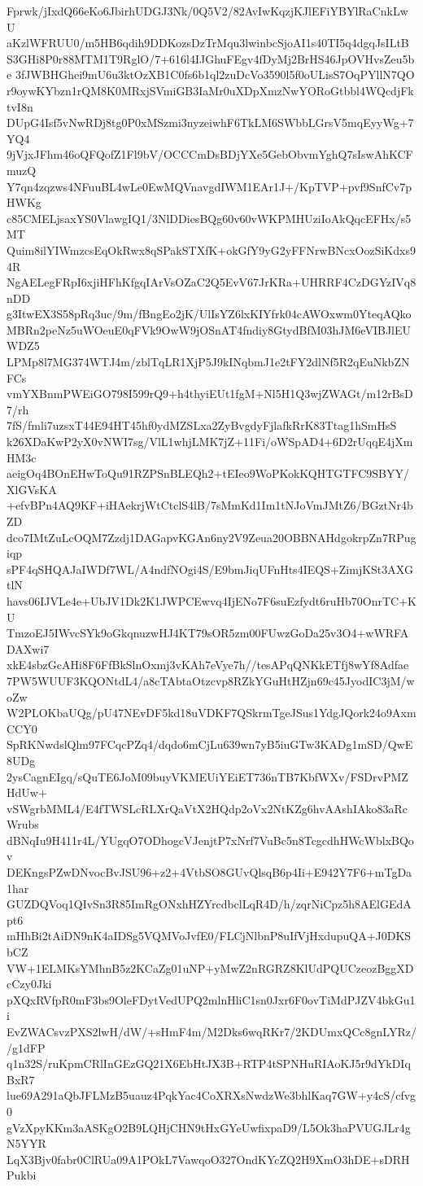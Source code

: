 Fprwk/jIxdQ66eKo6JbirhUDGJ3Nk/0Q5V2/82AvIwKqzjKJlEFiYBYlRaCnkLwU
aKzlWFRUU0/m5HB6qdih9DDKozsDzTrMqu3lwinbcSjoAI1s40TI5q4dgqJsILtB
S3GHi8P0r88MTM1T9RglO/7+616l4IJGhuFEgv4fDyMj2BrHS46JpOVHvsZeu5be
3fJWBHGhei9mU6u3ktOzXB1C0fs6b1ql2zuDcVo3590l5f0oULisS7OqPYllN7QO
r9oywKYbzn1rQM8K0MRxjSVmiGB3IaMr0uXDpXmzNwYORoGtbbl4WQcdjFktvI8n
DUpG4Isf5vNwRDj8tg0P0xMSzmi3nyzeiwhF6TkLM6SWbbLGrsV5mqEyyWg+7YQ4
9jVjxJFhm46oQFQofZ1Fl9bV/OCCCmDsBDjYXe5GebObvmYghQ7sIswAhKCFmuzQ
Y7qn4zqzws4NFuuBL4wLe0EwMQVnavgdIWM1EAr1J+/KpTVP+pvf9SnfCv7pHWKg
c85CMELjsaxYS0VlawgIQ1/3NlDDiesBQg60v60vWKPMHUziIoAkQqcEFHx/s5MT
Quim8ilYIWmzcsEqOkRwx8qSPakSTXfK+okGfY9yG2yFFNrwBNcxOozSiKdxs94R
NgAELegFRpI6xjiHFhKfgqIArVsOZaC2Q5EvV67JrKRa+UHRRF4CzDGYzIVq8nDD
g3ItwEX3S58pRq3uc/9m/fBngEo2jK/UlIsYZ6lxKIYfrk04cAWOxwm0YteqAQko
MBRn2peNz5uWOeuE0qFVk9OwW9jOSnAT4fndiy8GtydBfM03hJM6eVIBJlEUWDZ5
LPMp8l7MG374WTJ4m/zblTqLR1XjP5J9kINqbmJ1e2tFY2dlNf5R2qEuNkbZNFCs
vmYXBnmPWEiGO798I599rQ9+h4thyiEUt1fgM+Nl5H1Q3wjZWAGt/m12rBsD7/rh
7fS/fmli7uzsxT44E94HT45hf0ydMZSLxa2ZyBvgdyFjlafkRrK83Ttag1hSmHsS
k26XDaKwP2yX0vNWI7sg/VlL1whjLMK7jZ+11Fi/oWSpAD4+6D2rUqqE4jXmHM3c
aeigOq4BOnEHwToQu91RZPSnBLEQh2+tEIeo9WoPKokKQHTGTFC9SBYY/XlGVsKA
+efvBPn4AQ9KF+iHAekrjWtCtclS4lB/7sMmKd1Im1tNJoVmJMtZ6/BGztNr4bZD
dco7IMtZuLcOQM7Zzdj1DAGapvKGAn6ny2V9Zeua20OBBNAHdgokrpZn7RPugiqp
sPF4qSHQAJaIWDf7WL/A4ndfNOgi4S/E9bmJiqUFnHts4IEQS+ZimjKSt3AXGtlN
havs06IJVLe4e+UbJV1Dk2K1JWPCEwvq4IjENo7F6suEzfydt6ruHb70OnrTC+KU
TmzoEJ5IWvcSYk9oGkqnuzwHJ4KT79sOR5zm00FUwzGoDa25v3O4+wWRFADAXwi7
xkE4sbzGcAHi8F6FfBkSlnOxmj3vKAh7eVye7h//tesAPqQNKkETfj8wYf8Adfae
7PW5WUUF3KQONtdL4/a8cTAbtaOtzcvp8RZkYGuHtHZjn69c45JyodIC3jM/woZw
W2PLOKbaUQg/pU47NEvDF5kd18uVDKF7QSkrmTgeJSus1YdgJQork24o9AxmCCY0
SpRKNwdslQlm97FCqcPZq4/dqdo6mCjLu639wn7yB5iuGTw3KADg1mSD/QwE8UDg
2ysCagnEIgq/sQuTE6JoM09buyVKMEUiYEiET736nTB7KbfWXv/FSDrvPMZHdUw+
vSWgrbMML4/E4fTWSLcRLXrQaVtX2HQdp2oVx2NtKZg6hvAAshIAko83aRcWrubs
dBNqIu9H411r4L/YUgqO7ODhogcVJenjtP7xNrf7VuBc5n8TcgcdhHWcWblxBQov
DEKngsPZwDNvocBvJSU96+z2+4VtbSO8GUvQlsqB6p4Ii+E942Y7F6+mTgDa1har
GUZDQVoq1QIvSn3R85ImRgONxhHZYrcdbclLqR4D/h/zqrNiCpz5h8AElGEdApt6
mHhBi2tAiDN9nK4aIDSg5VQMVoJvfE0/FLCjNlbnP8uIfVjHxdupuQA+J0DKSbCZ
VW+1ELMKsYMhnB5z2KCaZg01uNP+yMwZ2nRGRZ8KlUdPQUCzeozBggXDcCzy0Jki
pXQxRVfpR0mF3bs9OleFDytVedUPQ2mlnHliC1sn0Jxr6F0ovTiMdPJZV4bkGu1i
EvZWACsvzPXS2lwH/dW/+sHmF4m/M2Dks6wqRKr7/2KDUmxQCc8gnLYRz//g1dFP
q1n32S/ruKpmCRlInGEzGQ21X6EbHtJX3B+RTP4tSPNHuRIAoKJ5r9dYkDIqBxR7
lue69A291aQbJFLMzB5uauz4PqkYac4CoXRXsNwdzWe3bhlKaq7GW+y4cS/cfvg0
gVzXpyKKm3aASKgO2B9LQHjCHN9tHxGYeUwfixpaD9/L5Ok3haPVUGJLr4gN5YYR
LqX3Bjv0fabr0ClRUa09A1POkL7VawqoO327OndKYcZQ2H9XmO3hDE+sDRHPukbi
